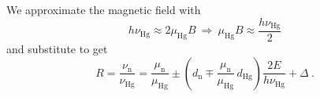 We approximate the magnetic field with
\begin{equation}
  h \nu_\text{Hg} \approx 2 \mu_\text{Hg} B \ \Rightarrow \ \mu_\text{Hg} B \approx \frac{h \nu_\text{Hg}}{2}
\end{equation}
and substitute to get
\begin{equation}
  R = \frac{\nu_\text{n}}{\nu_\text{Hg}} = \frac{\mu_\text{n}}{\mu_\text{Hg}} \pm \left( d_\text{n} \mp \frac{\mu_\text{n}}{\mu_\text{Hg}} \, d_\text{Hg} \right) \frac{2 E}{ h  \nu_\text{Hg}} + \Delta \ .
\end{equation}
